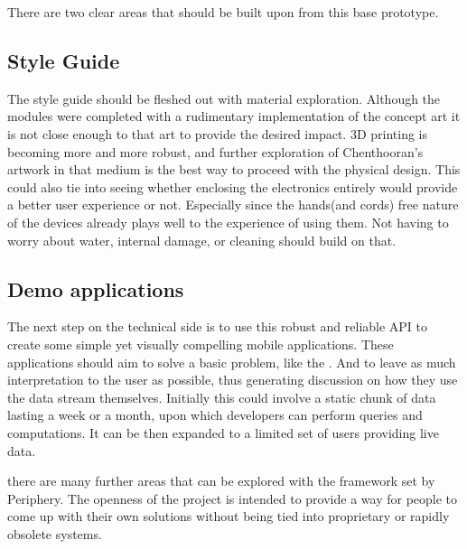 
There are two clear areas that should be built upon from this base prototype.

\subsection{Style Guide}

The style guide should be fleshed out with material exploration. Although the modules were completed with a rudimentary implementation of the concept art it is not close enough to that art to provide the desired impact. 3D printing is becoming more and more robust, and further exploration of Chenthooran's artwork in that medium is the best way to proceed with the physical design. This could also tie into seeing whether enclosing the electronics entirely would provide a better user experience or not. Especially since the hands(and cords) free nature of the devices already plays well to the experience of using them. Not having to worry about water, internal damage, or cleaning should build on that.

\subsection{Demo applications}

The next step on the technical side is to use this robust and reliable API to create some simple yet visually compelling mobile applications. These applications should aim to solve a basic problem, like the . And to leave as much interpretation to the user as possible, thus generating discussion on how they use the data stream themselves. Initially this could involve a static chunk of data lasting a week or a month, upon which developers can perform queries and computations. It can be then expanded to a limited set of users providing live data.

 there are many further areas that can be explored with the framework set by Periphery. The openness of the project is intended to provide a way for people to come up with their own solutions without being tied into proprietary or rapidly obsolete systems.